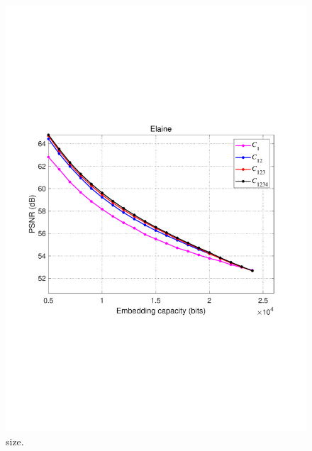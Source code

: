 \documentclass[review,3p,10pt,sort&compress]{elsarticle}
\begin{document}
\begin{figure}
{\begin{minipage}[t]{0.39\linewidth}
\includegraphics[width=1\textwidth]{figures/Result/size/Elaine.pdf}
\end{minipage}
}
\centering
\caption{size.}
\label{fig:size}       %
\end{figure}
\end{document}
